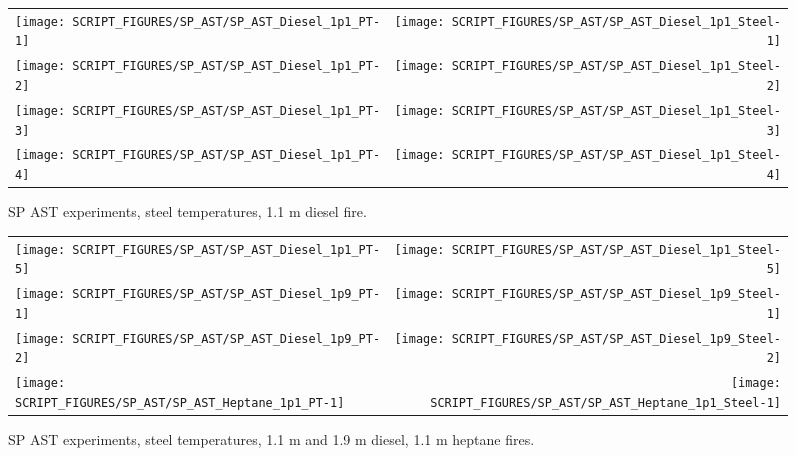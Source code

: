 \newpage

\begin{figure}[p]
\begin{tabular*}{\textwidth}{l@{\extracolsep{\fill}}r}
\texttt{[image: SCRIPT\_FIGURES/SP\_AST/SP\_AST\_Diesel\_1p1\_PT-1]}  &  \texttt{[image: SCRIPT\_FIGURES/SP\_AST/SP\_AST\_Diesel\_1p1\_Steel-1]}    \\
\texttt{[image: SCRIPT\_FIGURES/SP\_AST/SP\_AST\_Diesel\_1p1\_PT-2]}  &  \texttt{[image: SCRIPT\_FIGURES/SP\_AST/SP\_AST\_Diesel\_1p1\_Steel-2]}    \\
\texttt{[image: SCRIPT\_FIGURES/SP\_AST/SP\_AST\_Diesel\_1p1\_PT-3]}  &  \texttt{[image: SCRIPT\_FIGURES/SP\_AST/SP\_AST\_Diesel\_1p1\_Steel-3]}    \\
\texttt{[image: SCRIPT\_FIGURES/SP\_AST/SP\_AST\_Diesel\_1p1\_PT-4]}  &  \texttt{[image: SCRIPT\_FIGURES/SP\_AST/SP\_AST\_Diesel\_1p1\_Steel-4]}
\end{tabular*}
\caption[SP AST experiments, steel temperatures, 1.1 m diesel fire]{SP AST experiments, steel temperatures, 1.1 m diesel fire.}
\label{SP_Diesel_1p1_PT_Steel}
\end{figure}

\begin{figure}[p]
\begin{tabular*}{\textwidth}{l@{\extracolsep{\fill}}r}
\texttt{[image: SCRIPT\_FIGURES/SP\_AST/SP\_AST\_Diesel\_1p1\_PT-5]}  &  \texttt{[image: SCRIPT\_FIGURES/SP\_AST/SP\_AST\_Diesel\_1p1\_Steel-5]}   \\
\texttt{[image: SCRIPT\_FIGURES/SP\_AST/SP\_AST\_Diesel\_1p9\_PT-1]}  &  \texttt{[image: SCRIPT\_FIGURES/SP\_AST/SP\_AST\_Diesel\_1p9\_Steel-1]}   \\
\texttt{[image: SCRIPT\_FIGURES/SP\_AST/SP\_AST\_Diesel\_1p9\_PT-2]}  &  \texttt{[image: SCRIPT\_FIGURES/SP\_AST/SP\_AST\_Diesel\_1p9\_Steel-2]}   \\
\texttt{[image: SCRIPT\_FIGURES/SP\_AST/SP\_AST\_Heptane\_1p1\_PT-1]} &  \texttt{[image: SCRIPT\_FIGURES/SP\_AST/SP\_AST\_Heptane\_1p1\_Steel-1]}
\end{tabular*}
\caption[SP AST experiments, steel temperatures, 1.1 m and 1.9 m diesel, 1.1 m heptane fires]{SP AST experiments, steel temperatures, 1.1 m and 1.9 m diesel, 1.1 m heptane fires.}
\label{SP_Diesel_1p9_PT_Steel}
\end{figure}

